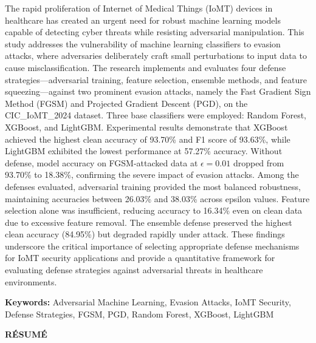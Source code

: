 \documentclass[12pt,a4paper,oneside]{report}
\begin{document}
The rapid proliferation of Internet of Medical Things (IoMT) devices in healthcare has created an urgent need for robust machine learning models capable of detecting cyber threats while resisting adversarial manipulation. This study addresses the vulnerability of machine learning classifiers to evasion attacks, where adversaries deliberately craft small perturbations to input data to cause misclassification. The research implements and evaluates four defense strategies---adversarial training, feature selection, ensemble methods, and feature squeezing---against two prominent evasion attacks, namely the Fast Gradient Sign Method (FGSM) and Projected Gradient Descent (PGD), on the CIC\_IoMT\_2024 dataset. Three base classifiers were employed: Random Forest, XGBoost, and LightGBM. Experimental results demonstrate that XGBoost achieved the highest clean accuracy of 93.70\% and F1 score of 93.63\%, while LightGBM exhibited the lowest performance at 57.27\% accuracy. Without defense, model accuracy on FGSM-attacked data at $\epsilon = 0.01$ dropped from 93.70\% to 18.38\%, confirming the severe impact of evasion attacks. Among the defenses evaluated, adversarial training provided the most balanced robustness, maintaining accuracies between 26.03\% and 38.03\% across epsilon values. Feature selection alone was insufficient, reducing accuracy to 16.34\% even on clean data due to excessive feature removal. The ensemble defense preserved the highest clean accuracy (84.95\%) but degraded rapidly under attack. These findings underscore the critical importance of selecting appropriate defense mechanisms for IoMT security applications and provide a quantitative framework for evaluating defense strategies against adversarial threats in healthcare environments.

\vspace{0.5cm}
\noindent\textbf{Keywords:} Adversarial Machine Learning, Evasion Attacks, IoMT Security, Defense Strategies, FGSM, PGD, Random Forest, XGBoost, LightGBM
\newpage

\thispagestyle{empty}
\begin{center}
    {\Large\bfseries R\'ESUM\'E}
\end{center}
\vspace{0.5cm}
\end{document}
